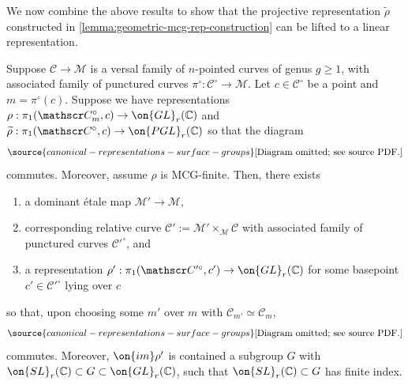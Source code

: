 We now combine the above results to show that the projective representation $\widetilde{\rho}$ constructed in \autoref{lemma:geometric-mcg-rep-construction}
can be lifted to a linear representation.

\begin{proposition}
\notready
	\label{proposition:gl-lift}
	Suppose $\mathscr C \to \mathscr M$ is a versal family of $n$-pointed
	curves of genus $g\geq 1$, with associated family of punctured curves
	$\pi^\circ: \mathscr{C}^\circ\to \mathscr{M}$. Let $c\in \mathscr{C}^\circ$ be a point and $m=\pi^\circ(c)$.
	Suppose we have representations $\rho: \pi_1(\mathscr C_m^\circ, c) \to
	\on{GL}_r(\mathbb C)$
	and $\widetilde{\rho}: \pi_1(\mathscr C^\circ, c) \to \on{PGL}_r(\mathbb
	C)$ so that the diagram
	\begin{equation}
		\label{equation:rho-and-tilde-rho-compatibility}
\source{canonical-representations-surface-groups}
		\text{[Diagram omitted; see source PDF.]}\end{equation}
	commutes.
	Moreover, assume $\rho$ is MCG-finite.
	Then, there exists
	\begin{enumerate}
		\item a dominant \'etale map $\mathscr M' \to \mathscr M$,
		\item corresponding relative curve $\mathscr C' := \mathscr M'
	\times_{\mathscr M} \mathscr C$ with associated family of punctured curves ${\mathscr{C}'}^\circ$,
	and
\item a representation $\rho' : \pi_1(\mathscr C'^\circ, c') \to
	\on{GL}_r(\mathbb C)$ for some basepoint $c' \in \mathscr C'^\circ$ lying over $c$
	\end{enumerate}
so that,
	upon choosing some $m'$ over $m$ with $\mathscr C_{m'} \simeq \mathscr C_m$,
	\begin{equation}
		\label{equation:cover-rep-compatibility}
\source{canonical-representations-surface-groups}
		\text{[Diagram omitted; see source PDF.]}\end{equation}
	commutes.
	Moreover, $\on{im} \rho'$ is contained a subgroup $G$ with $\on{SL}_r(\mathbb
	C) \subset G \subset
	\on{GL}_r(\mathbb C)$, such that $\on{SL}_r(\mathbb C) \subset G$ has
	finite index.
\end{proposition}
